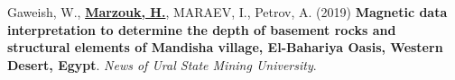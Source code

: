 \begin{scholarship}
	{
		Gaweish, W., \textbf{\underline{Marzouk, H.}}, MARAEV, I.,  Petrov, A. (2019) \textbf{Magnetic data interpretation to determine the depth of basement rocks and structural elements of Mandisha village, El-Bahariya Oasis, Western Desert, Egypt}. \textit{ News of Ural State Mining University}.  \newline
		\newline  }


\end{scholarship}




